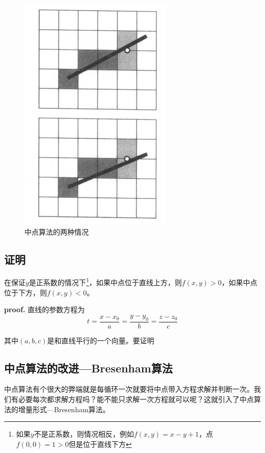 \begin{figure}[H]
    \centering
    \includegraphics[scale=0.5]{figures/中点算法的两种情况.png}
    \caption{中点算法的两种情况}
\end{figure}

\subsection*{证明}

\begin{proposition}
    在保证$y$是正系数的情况下\footnote{如果$y$不是正系数，则情况相反，例如$f(x,y)=x-y+1$，点$f(0,0)=1>0$但是位于直线下方}，如果中点位于直线上方，则$f(x,y)>0$，如果中点位于下方，则$f(x,y)<0$。
\end{proposition}

\textbf{proof. } 直线的参数方程为
\begin{equation}
    t=\frac{x-x_0}{a}=\frac{y-y_0}{b}=\frac{z-z_0}{c}
\end{equation}

其中$(a,b,c)$是和直线平行的一个向量。要证明

\subsection*{中点算法的改进—Bresenham算法}

中点算法有个很大的弊端就是每循环一次就要将中点带入方程求解并判断一次。我们有必要每次都求解方程吗？能不能只求解一次方程就可以呢？这就引入了中点算法的增量形式—Bresenham算法。

